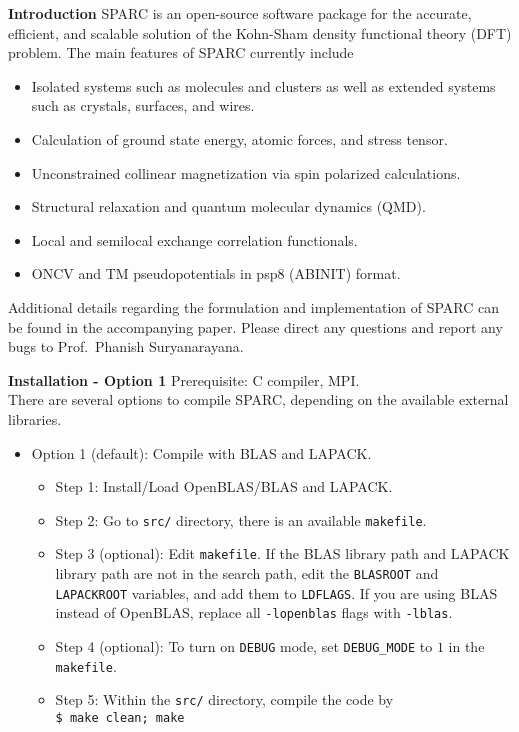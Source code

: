 \begin{frame}[allowframebreaks]{\textbf{Introduction}} \label{Introduction}
SPARC is an open-source software package for the accurate, efficient, and scalable solution of the Kohn-Sham density functional theory (DFT) problem. The main features of SPARC currently include
\begin{itemize}
  \item Isolated systems such as molecules and clusters as well as extended systems such as crystals, surfaces, and wires. 
  \item Calculation of ground state energy, atomic forces, and stress tensor.
  \item Unconstrained collinear magnetization via spin polarized calculations.
  \item Structural relaxation and quantum molecular dynamics (QMD). 
  \item Local and semilocal exchange correlation functionals. 
  \item ONCV and TM pseudopotentials in psp8 (ABINIT) format. 
\end{itemize}
Additional details regarding the formulation and implementation of SPARC can be found in the accompanying paper. Please direct any questions and report any bugs to Prof.~Phanish Suryanarayana.

\end{frame}



\begin{frame}{\textbf{Installation - Option 1}} \label{Installation:1}
Prerequisite: C compiler, MPI.\\
There are several options to compile SPARC, depending on the available external libraries.
\begin{itemize}
\item Option 1 (default): Compile with BLAS and LAPACK.
	\begin{itemize}
		\item Step 1: Install/Load OpenBLAS/BLAS and LAPACK.
		\item Step 2: Go to \texttt{src/} directory, there is an available \texttt{makefile}.
		\item Step 3 (optional): Edit \texttt{makefile}. If the BLAS library path and LAPACK library path are not in the search path, edit the \texttt{BLASROOT} and \texttt{LAPACKROOT} variables, and add them to \texttt{LDFLAGS}. If you are using BLAS instead of OpenBLAS, replace all \texttt{-lopenblas} flags with \texttt{-lblas}.
		\item Step 4 (optional): To turn on \texttt{DEBUG} mode, set \texttt{DEBUG\_MODE} to $1$ in the \texttt{makefile}.
		\item Step 5: Within the \texttt{src/} directory, compile the code by \\
		      \texttt{\$ make clean; make}
	\end{itemize}
\end{itemize}
\end{frame}


